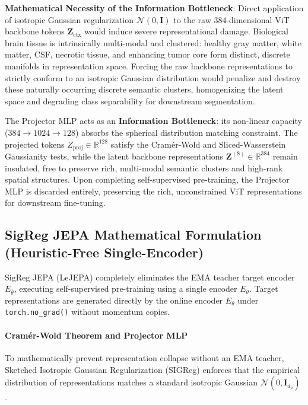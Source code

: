 \documentclass{article}
\begin{document}
\textbf{Mathematical Necessity of the Information Bottleneck}: Direct application of isotropic Gaussian regularization $\mathcal{N}(0, \mathbf{I})$ to the raw 384-dimensional ViT backbone tokens $\mathbf{Z}_{\text{ctx}}$ would induce severe representational damage. Biological brain tissue is intrinsically multi-modal and clustered: healthy gray matter, white matter, CSF, necrotic tissue, and enhancing tumor core form distinct, discrete manifolds in representation space. Forcing the raw backbone representations to strictly conform to an isotropic Gaussian distribution would penalize and destroy these naturally occurring discrete semantic clusters, homogenizing the latent space and degrading class separability for downstream segmentation.

The Projector MLP acts as an \textbf{Information Bottleneck}: its non-linear capacity ($384 \to 1024 \to 128$) absorbs the spherical distribution matching constraint. The projected tokens $Z_{\text{proj}} \in \mathbb{R}^{128}$ satisfy the Cram\'er-Wold and Sliced-Wasserstein Gaussianity tests, while the latent backbone representations $\mathbf{Z}^{(8)} \in \mathbb{R}^{384}$ remain insulated, free to preserve rich, multi-modal semantic clusters and high-rank spatial structures. Upon completing self-supervised pre-training, the Projector MLP is discarded entirely, preserving the rich, unconstrained ViT representations for downstream fine-tuning.

\subsection{SigReg JEPA Mathematical Formulation (Heuristic-Free Single-Encoder)}

SigReg JEPA (LeJEPA) \citep{balestriero2025lejepa} completely eliminates the EMA teacher target encoder $E_{\bar{\theta}}$, executing self-supervised pre-training using a single encoder $E_\theta$. Target representations are generated directly by the online encoder $E_\theta$ under \texttt{torch.no\_grad()} without momentum copies.

\paragraph{Cram\'er-Wold Theorem and Projector MLP}
To mathematically prevent representation collapse without an EMA teacher, Sketched Isotropic Gaussian Regularization (SIGReg) enforces that the empirical distribution of representations matches a standard isotropic Gaussian $\mathcal{N}(0, \mathbf{I}_{d_p})$ \citep{balestriero2025lejepa}.
\end{document}
